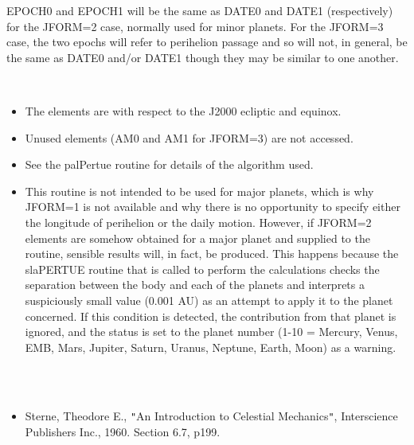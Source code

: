 \documentclass[twoside,11pt]{article}
\renewcommand{\_}{\texttt{\symbol{95}}}
\newcommand{\sstdiytopic}[2]{\item[{\hspace{-0.35em}#1\hspace{-0.35em}:}]
\mbox{} \\[1.3ex] #2}
\newcommand{\sstitemlist}[1]{
  \mbox{} \\
  \vspace{-3.5ex}
  \begin{itemize}
     #1
  \end{itemize}
}
\newcommand{\sstitem}{\item}
\newcommand{\sstdiytopic}[2]{\item[{#1}] #2 }
\newcommand{\sstitemlist}[1]{
      \begin{itemize}
         #1
      \end{itemize}
      \\
   }
\newcommand{\sstitem}{\item}
\begin{document}
{{        EPOCH0 and EPOCH1 will be the same as DATE0 and DATE1
        (respectively) for the JFORM=2 case, normally used for minor
        planets.  For the JFORM=3 case, the two epochs will refer to
        perihelion passage and so will not, in general, be the same as
        DATE0 and/or DATE1 though they may be similar to one another.
      \sstitemlist{

         \sstitem
         The elements are with respect to the J2000 ecliptic and equinox.

         \sstitem
         Unused elements (AM0 and AM1 for JFORM=3) are not accessed.

         \sstitem
         See the palPertue routine for details of the algorithm used.

         \sstitem
         This routine is not intended to be used for major planets, which
           is why JFORM=1 is not available and why there is no opportunity
           to specify either the longitude of perihelion or the daily
           motion.  However, if JFORM=2 elements are somehow obtained for a
           major planet and supplied to the routine, sensible results will,
           in fact, be produced.  This happens because the sla\_PERTUE routine
           that is called to perform the calculations checks the separation
           between the body and each of the planets and interprets a
           suspiciously small value (0.001 AU) as an attempt to apply it to
           the planet concerned.  If this condition is detected, the
           contribution from that planet is ignored, and the status is set to
           the planet number (1-10 = Mercury, Venus, EMB, Mars, Jupiter,
           Saturn, Uranus, Neptune, Earth, Moon) as a warning.
      }
   }
   \sstdiytopic{
      See Also
   }{
      \sstitemlist{

         \sstitem
         Sterne, Theodore E., {\tt "}An Introduction to Celestial Mechanics{\tt "},
           Interscience Publishers Inc., 1960.  Section 6.7, p199.
      }
   }
}
\end{document}
